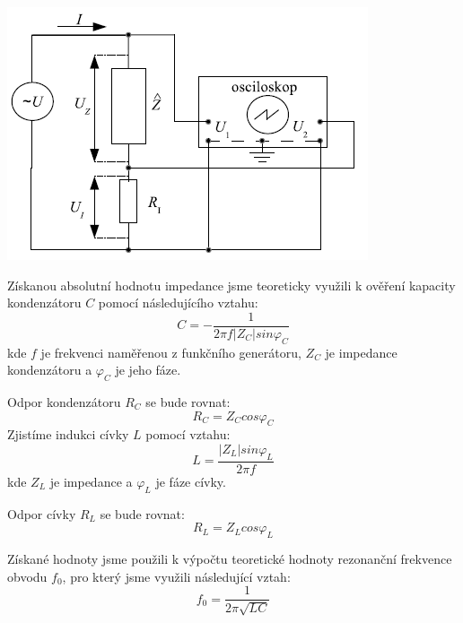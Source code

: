 \documentclass[a4paper,11pt]{article}
\begin{document}
\begin{minipage}[t]{0.5\textwidth} 
            \centering
            \includegraphics[scale=0.5]{imp1}
            \captionsetup{justification=centering, font=footnotesize}
            \label{fig:imp1}
            \vspace{10pt}
            \raggedright
            \par Získanou absolutní hodnotu impedance jsme teoreticky využili k ověření kapacity kondenzátoru $C$ pomocí následujícího vztahu:
            \begin{equation}
                C = -\frac{1}{2\pi f \vert Z_C\vert sin\varphi_C}
            \end{equation}
            kde $f$ je frekvenci naměřenou z funkčního generátoru, $Z_C$ je impedance kondenzátoru a $\varphi_C$ je jeho fáze. 
            \par Odpor kondenzátoru $R_C$ se bude rovnat: 
            \begin{equation}
                R_C = Z_C cos\varphi_C
            \end{equation}
            Zjistíme indukci cívky $L$ pomocí vztahu:
            \begin{equation}
                L = \frac{\vert Z_L\vert sin\varphi_L}{2\pi f}
            \end{equation}
            kde $Z_L$ je impedance a $\varphi_L$ je fáze cívky.
            \par Odpor cívky $R_L$ se bude rovnat: 
            \begin{equation}
                R_L = Z_L cos\varphi_L
            \end{equation}
            \par Získané hodnoty jsme použili k výpočtu teoretické hodnoty rezonanční frekvence obvodu $f_0$, pro který jsme využili následující vztah:
            \begin{equation}
                f_0 = \frac{1}{2\pi \sqrt{LC}}
            \end{equation}

\end{minipage}
\end{document}

